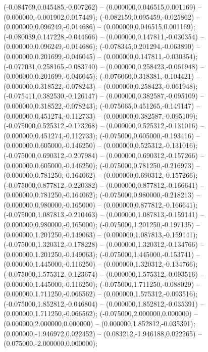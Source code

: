  (-0.084769,0.045485,-0.007262) -- (0.000000,0.046515,0.001169) -- (0.000000,-0.001902,0.017449);
 (-0.082159,0.095459,-0.025862) -- (0.000000,0.096249,-0.014686) -- (0.000000,0.046515,0.001169);
 (-0.080039,0.147228,-0.044666) -- (0.000000,0.147811,-0.030354) -- (0.000000,0.096249,-0.014686);
 (-0.078345,0.201294,-0.063890) -- (0.000000,0.201699,-0.046045) -- (0.000000,0.147811,-0.030354);
 (-0.077031,0.258165,-0.083740) -- (0.000000,0.258423,-0.061948) -- (0.000000,0.201699,-0.046045);
 (-0.076060,0.318381,-0.104421) -- (0.000000,0.318522,-0.078243) -- (0.000000,0.258423,-0.061948);
 (-0.075411,0.382530,-0.126147) -- (0.000000,0.382587,-0.095109) -- (0.000000,0.318522,-0.078243);
 (-0.075065,0.451265,-0.149147) -- (0.000000,0.451274,-0.112733) -- (0.000000,0.382587,-0.095109);
 (-0.075000,0.525312,-0.173268) -- (0.000000,0.525312,-0.131016) -- (0.000000,0.451274,-0.112733);
 (-0.075000,0.605000,-0.193416) -- (0.000000,0.605000,-0.146250) -- (0.000000,0.525312,-0.131016);
 (-0.075000,0.690312,-0.207984) -- (0.000000,0.690312,-0.157266) -- (0.000000,0.605000,-0.146250);
 (-0.075000,0.781250,-0.216973) -- (0.000000,0.781250,-0.164062) -- (0.000000,0.690312,-0.157266);
 (-0.075000,0.877812,-0.220382) -- (0.000000,0.877812,-0.166641) -- (0.000000,0.781250,-0.164062);
 (-0.075000,0.980000,-0.218213) -- (0.000000,0.980000,-0.165000) -- (0.000000,0.877812,-0.166641);
 (-0.075000,1.087813,-0.210463) -- (0.000000,1.087813,-0.159141) -- (0.000000,0.980000,-0.165000);
 (-0.075000,1.201250,-0.197135) -- (0.000000,1.201250,-0.149063) -- (0.000000,1.087813,-0.159141);
 (-0.075000,1.320312,-0.178228) -- (0.000000,1.320312,-0.134766) -- (0.000000,1.201250,-0.149063);
 (-0.075000,1.445000,-0.153741) -- (0.000000,1.445000,-0.116250) -- (0.000000,1.320312,-0.134766);
 (-0.075000,1.575312,-0.123674) -- (0.000000,1.575312,-0.093516) -- (0.000000,1.445000,-0.116250);
 (-0.075000,1.711250,-0.088029) -- (0.000000,1.711250,-0.066562) -- (0.000000,1.575312,-0.093516);
 (-0.075000,1.852812,-0.046804) -- (0.000000,1.852812,-0.035391) -- (0.000000,1.711250,-0.066562);
 (-0.075000,2.000000,0.000000) -- (0.000000,2.000000,0.000000) -- (0.000000,1.852812,-0.035391);
 (0.000000,-1.946972,0.022452) -- (0.083212,-1.946188,0.022265) -- (0.075000,-2.000000,0.000000);
